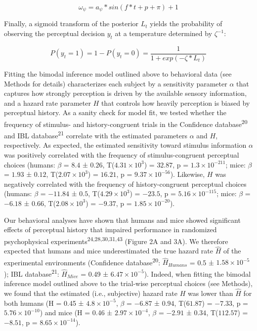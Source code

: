\documentclass[
]{article}
\begin{document}
\begin{equation}
\omega_{\psi} = a_{\psi} * sin(f * t + p + \pi) + 1
\end{equation}

Finally, a sigmoid transform of the posterior \(L_t\) yields the
probability of observing the perceptual decision \(y_t\) at a
temperature determined by \(\zeta^{-1}\):

\begin{equation}
P(y_t = 1) = 1 - P(y_t = 0) = \frac{1}{1 + exp(-\zeta * L_t)}
\end{equation}

Fitting the bimodal inference model outlined above to behavioral data
(see Methods for details) characterizes each subject by a sensitivity
parameter \(\alpha\) that captures how strongly perception is driven by
the available sensory information, and a hazard rate parameter \(H\)
that controls how heavily perception is biased by perceptual history. As
a sanity check for model fit, we tested whether the frequency of
stimulus- and history-congruent trials in the Confidence
database\textsuperscript{20} and IBL database\textsuperscript{21}
correlate with the estimated parameters \(\alpha\) and \(H\),
respectively. As expected, the estimated sensitivity toward stimulus
information \(\alpha\) was positively correlated with the frequency of
stimulus-congruent perceptual choices (humans: \(\beta\) = \(8.4\) ±
\(0.26\), T(\(\ensuremath{4.31\times 10^{3}}\)) = \(32.87\), p =
\(\ensuremath{1.3\times 10^{-211}}\); mice: \(\beta\) = \(1.93\) ±
\(0.12\), T(\(\ensuremath{2.07\times 10^{3}}\)) = \(16.21\), p =
\(\ensuremath{9.37\times 10^{-56}}\)). Likewise, \(H\) was negatively
correlated with the frequency of history-congruent perceptual choices
(humans: \(\beta\) = \(-11.84\) ± \(0.5\),
T(\(\ensuremath{4.29\times 10^{3}}\)) = \(-23.5\), p =
\(\ensuremath{5.16\times 10^{-115}}\); mice: \(\beta\) = \(-6.18\) ±
\(0.66\), T(\(\ensuremath{2.08\times 10^{3}}\)) = \(-9.37\), p =
\(\ensuremath{1.85\times 10^{-20}}\)).

Our behavioral analyses have shown that humans and mice showed
significant effects of perceptual history that impaired performance in
randomized psychophysical experiments\textsuperscript{24,28,30,31,43}
(Figure 2A and 3A). We therefore expected that humans and mice
underestimated the true hazard rate \(\hat{H}\) of the experimental
environments (Confidence database\textsuperscript{20}:
\(\hat{H}_{Humans}\) = 0.5 ± \ensuremath{1.58\times 10^{-5}}); IBL
database\textsuperscript{21}: \(\hat{H}_{Mice}\) = 0.49 ±
\ensuremath{6.47\times 10^{-5}}). Indeed, when fitting the bimodal
inference model outlined above to the trial-wise perceptual choices (see
Methods), we found that the estimated (i.e., subjective) hazard rate
\(H\) was lower than \(\hat{H}\) for both humans (H = 0.45 ±
\ensuremath{4.8\times 10^{-5}}, \(\beta\) = \(-6.87\) ± \(0.94\),
T(\(61.87\)) = \(-7.33\), p = \(\ensuremath{5.76\times 10^{-10}}\)) and
mice (H = 0.46 ± \ensuremath{2.97\times 10^{-4}}, \(\beta\) = \(-2.91\)
± \(0.34\), T(\(112.57\)) = \(-8.51\), p =
\(\ensuremath{8.65\times 10^{-14}}\)).
\end{document}
